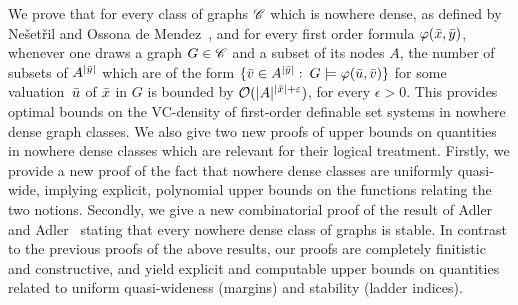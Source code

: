 We prove that for every class of graphs $\mathscr{C}$ which is nowhere dense, as defined by  Ne\v set\v ril and Ossona de Mendez~\cite{nevsetvril2010first,nevsetvril2011nowhere},
and for every  first order formula $\varphi(\bar{x},\bar{y})$, 
whenever one draws a graph $G\in \mathscr{C}$ and a subset of its nodes $A$, the number of subsets of $A^{|\bar{y}|}$ which are of the form $\{\bar{v}\in A^{|\bar{y}|}\, \colon\, G\models\varphi(\bar u,\bar{v})\}$ for some valuation~$\bar{u}$ of $\bar{x}$ in $G$
is bounded by $\mathcal{O}(|A|^{|\bar{x}|+\varepsilon})$, for every $\epsilon>0$. 
This provides optimal bounds on the VC-density of first-order definable set systems in nowhere dense graph classes.
%
We also give two new proofs of upper bounds on quantities in nowhere dense classes which are relevant for their logical treatment.
Firstly, we provide a new proof of the fact that nowhere dense classes are uniformly
quasi-wide, implying explicit, polynomial upper bounds on the functions
relating the two notions.  Secondly, we give a new combinatorial proof
of the result of Adler and Adler~\cite{adler2014interpreting} stating
that every nowhere dense class of graphs is stable. In contrast to the previous proofs of the above results,
our proofs are completely finitistic and constructive, and yield explicit and computable upper
bounds on quantities related to uniform quasi-wideness (margins) and stability (ladder indices).